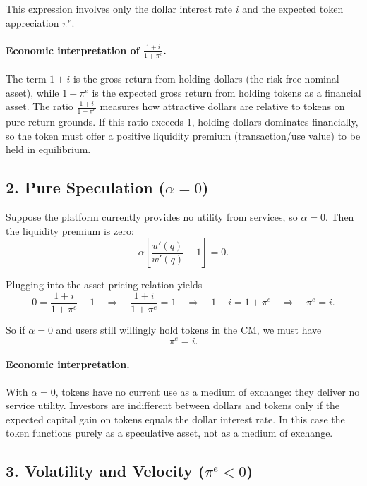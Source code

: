 \documentclass[11pt, a4paper]{article}
\begin{document}
This expression involves only the dollar interest rate \(i\) and the expected token appreciation \(\pi^e\).

\paragraph{Economic interpretation of \(\frac{1+i}{1+\pi^e}\).}

The term \(1+i\) is the gross return from holding dollars (the risk-free nominal asset), while \(1+\pi^e\) is the expected gross return from holding tokens as a financial asset.  
The ratio \(\frac{1+i}{1+\pi^e}\) measures how attractive dollars are relative to tokens on pure return grounds.  
If this ratio exceeds 1, holding dollars dominates financially, so the token must offer a positive liquidity premium (transaction/use value) to be held in equilibrium.

\subsection*{2. Pure Speculation (\(\alpha = 0\))}

Suppose the platform currently provides no utility from services, so \(\alpha = 0\).  
Then the liquidity premium is zero:
\[
\alpha\left[\frac{u'(q)}{w'(q)} - 1\right] = 0.
\]

Plugging into the asset-pricing relation yields
\[
0 = \frac{1+i}{1+\pi^e} - 1
\quad\Longrightarrow\quad
\frac{1+i}{1+\pi^e} = 1
\quad\Longrightarrow\quad
1+i = 1+\pi^e
\quad\Longrightarrow\quad
\pi^e = i.
\]

So if \(\alpha=0\) and users still willingly hold tokens in the CM, we must have
\[
\pi^e = i.
\]

\paragraph{Economic interpretation.}

With \(\alpha=0\), tokens have no current use as a medium of exchange: they deliver no service utility.  
Investors are indifferent between dollars and tokens only if the expected capital gain on tokens equals the dollar interest rate.  
In this case the token functions purely as a speculative asset, not as a medium of exchange.

\subsection*{3. Volatility and Velocity (\(\pi^e < 0\))}
\end{document}
